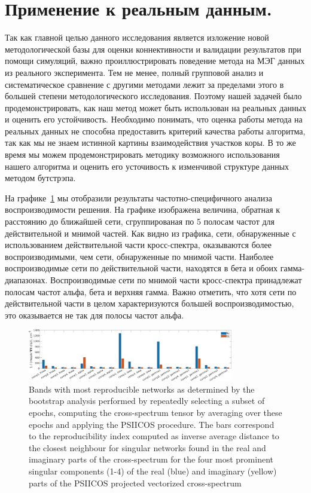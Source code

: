 \section{Применение к реальным данным.} Так как главной целью данного
исследования является изложение новой методологической базы для оценки
коннективности и валидации результатов при помощи симуляций, важно
проиллюстрировать поведение метода на МЭГ данных из реального эксперимента.
Тем не менее, полный групповой анализ и систематическое сравнение с другими
методами лежит за пределами этого в большей степени методологического исследования.
Поэтому нашей задачей было продемонстрировать, как наш метод может быть использован на
реальных данных и оценить его устойчивость.
Необходимо понимать, что оценка работы метода на
реальных данных не способна предоставить критерий качества работы алгоритма, так как
мы не знаем истинной картины взаимодействия участков коры. В то же время мы можем
продемонстрировать методику возможного использования нашего алгоритма и оценить
его усточивость к изменчивой структуре данных методом бутстрэпа.

На графике~\ref{fig:10} мы отобразили результаты частотно-специфичного
анализа воспроизводимости решения. На графике изображена величина, обратная к
расстоянию до ближайшей сети, сгруппированая по 5 полосам частот для
действительной и мнимой частей. Как видно из графика, сети, обнаруженные с
использованием действительной части кросс-спектра, оказываются более
воспроизводимыми, чем сети, обнаруженные по мнимой части. Наиболее воспроизводимые
сети по действительной части, находятся в бета и обоих гамма-диапазонах.
Воспроизводимые сети по мнимой части кросс-спектра принадлежат полосам частот
альфа, бета и верхняя гамма. Важно отметить, что хотя сети по действительной части
в целом характеризуются большей воспроизводимостью, это оказывается не так для
полосы частот альфа.

\begin{figure}[h!tpb]
 \centering
 \includegraphics[width=0.8\textwidth]{../images/psiicos_paper/Figure10_hr.jpg}
 \caption{Bands with most reproducible networks as determined by the bootstrap
     analysis performed by repeatedly selecting a subset of epochs, computing
     the cross-spectrum tensor by averaging over these epochs and applying the
     PSIICOS procedure.  The bars correspond to the reproducibility index
 computed as inverse average distance to the closest neighbour for singular
 networks found in the real and imaginary parts of the cross-spectrum for the
 four most prominent singular components (1-4) of the real (blue) and imaginary
 (yellow) parts of the PSIICOS projected vectorized cross-spectrum}
 \label{fig:10}
 \end{figure} %

